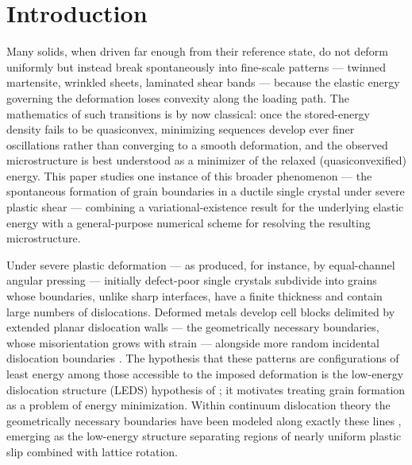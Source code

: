 \documentclass[12pt]{article}
\theoremstyle{plain}
\theoremstyle{definition}
\begin{document}
\section{Introduction}\label{sec:intro}

Many solids, when driven far enough from their reference state, do not deform uniformly but instead break spontaneously into fine-scale patterns --- twinned martensite, wrinkled sheets, laminated shear bands --- because the elastic energy governing the deformation loses convexity along the loading path. The mathematics of such transitions is by now classical: once the stored-energy density fails to be quasiconvex, minimizing sequences develop ever finer oscillations rather than converging to a smooth deformation, and the observed microstructure is best understood as a minimizer of the relaxed (quasiconvexified) energy. This paper studies one instance of this broader phenomenon --- the spontaneous formation of grain boundaries in a ductile single crystal under severe plastic shear --- combining a variational-existence result for the underlying elastic energy with a general-purpose numerical scheme for resolving the resulting microstructure.

Under severe plastic deformation --- as produced, for instance, by equal-channel angular pressing \citep{segal1995materials,valiev2006principles} --- initially defect-poor single crystals subdivide into grains whose boundaries, unlike sharp interfaces, have a finite thickness and contain large numbers of dislocations. Deformed metals develop cell blocks delimited by extended planar dislocation walls --- the geometrically necessary boundaries, whose misorientation grows with strain --- alongside more random incidental dislocation boundaries \citep{kuhlmann1991geometrically,hughes1997high}. The hypothesis that these patterns are configurations of least energy among those accessible to the imposed deformation is the low-energy dislocation structure (LEDS) hypothesis of \citet{kuhlmann1989theory}; it motivates treating grain formation as a problem of energy minimization. Within continuum dislocation theory the geometrically necessary boundaries have been modeled along exactly these lines \citep{koster2015bformation,koster2015aformation}, emerging as the low-energy structure separating regions of nearly uniform plastic slip combined with lattice rotation.
\end{document}
